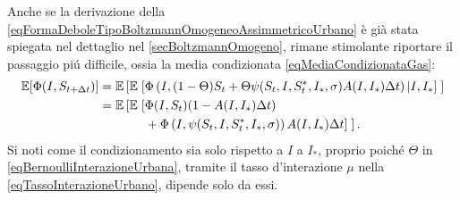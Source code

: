         \begin{oss}
          Anche se la derivazione della \ref{eqFormaDeboleTipoBoltzmannOmogeneoAssimmetricoUrbano} è già stata spiegata nel dettaglio nel \cref{secBoltzmannOmogeno}, rimane stimolante riportare il passaggio piú difficile, ossia la media condizionata \cref{eqMediaCondizionataGas}:
          \begin{equation*}
            \begin{aligned}
              \mathbb E[\Phi(I,S_{t+\Delta t})]=
              \mathbb E\left[\mathbb E\right.[
                &\Phi\left(I,(1-\Theta)S_t
                +\Theta\psi(S_t,I,S_t^*,I_*,\sigma)
                A(I,I_*)\Delta t\right)|I,I_*
              ]\left.\vphantom{\mathbb E}\right]\\
              =\mathbb E\left[
                \mathbb E\right.[
                &\Phi(I,S_t)(1-A(I,I_*)\Delta t)
                \\&+\Phi\left(
                  I,\psi(S_t,I,S_t^*,I_*,\sigma)
                \right)A(I,I_*)\Delta t
              ]\left.\vphantom{\mathbb E}\right].
            \end{aligned}
          \end{equation*}
          Si noti come il condizionamento sia solo rispetto a \(I\) a \(I_*\), proprio poiché \(\Theta\) in \ref{eqBernoulliInterazioneUrbana}, tramite il tasso d'interazione \(\mu\) nella \cref{eqTassoInterazioneUrbano}, dipende solo da essi.
        \end{oss}
      

